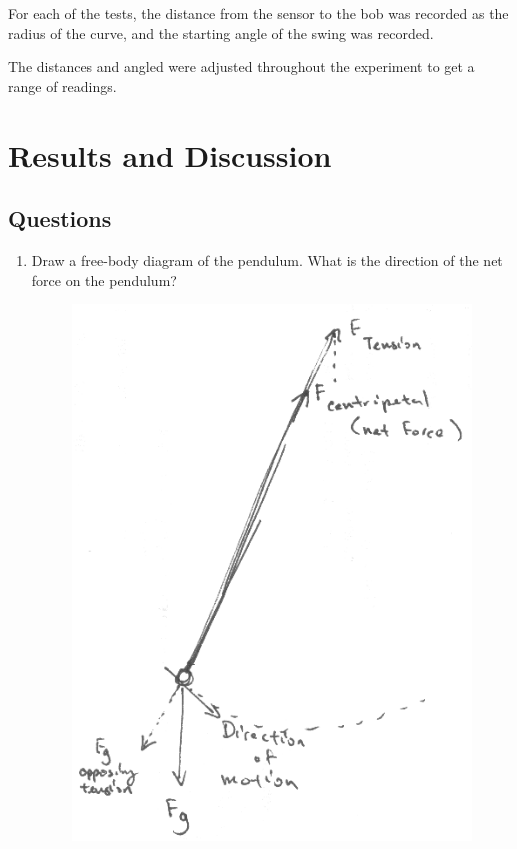 For each of the tests, the distance from the sensor to the bob was recorded as the radius of the curve,
and the starting angle of the swing was recorded.

The distances and angled were adjusted throughout the experiment to get a range of readings.

\section{Results and Discussion}

\subsection{Questions}

\begin{enumerate}

\item Draw a free-body diagram of the pendulum. What is the direction of the net force on the pendulum?

\begin{figure}[h]

\begin{center}
\includegraphics[scale=0.3]{content/fig2}
\end{center}


\end{figure}
\end{enumerate}
